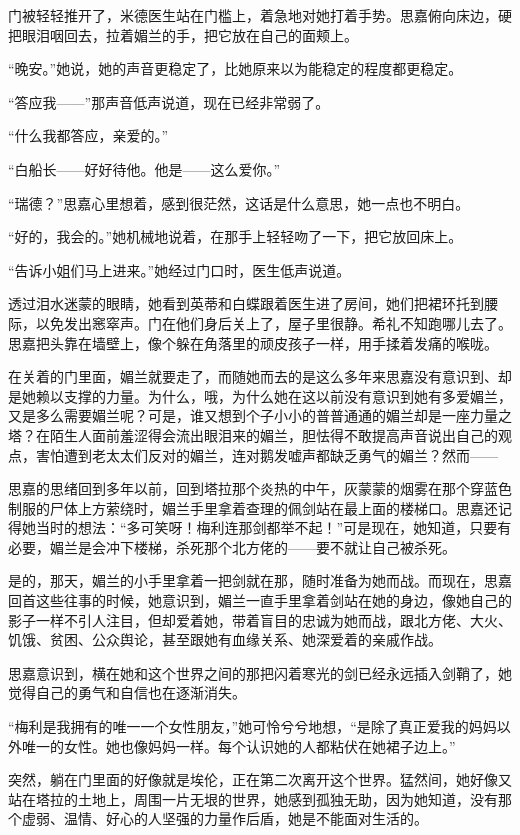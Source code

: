 \par 门被轻轻推开了，米德医生站在门槛上，着急地对她打着手势。思嘉俯向床边，硬把眼泪咽回去，拉着媚兰的手，把它放在自己的面颊上。
\par “晚安。”她说，她的声音更稳定了，比她原来以为能稳定的程度都更稳定。
\par “答应我——”那声音低声说道，现在已经非常弱了。
\par “什么我都答应，亲爱的。”
\par “白船长——好好待他。他是——这么爱你。”
\par “瑞德？”思嘉心里想着，感到很茫然，这话是什么意思，她一点也不明白。
\par “好的，我会的。”她机械地说着，在那手上轻轻吻了一下，把它放回床上。
\par “告诉小姐们马上进来。”她经过门口时，医生低声说道。
\par 透过泪水迷蒙的眼睛，她看到英蒂和白蝶跟着医生进了房间，她们把裙环托到腰际，以免发出窸窣声。门在他们身后关上了，屋子里很静。希礼不知跑哪儿去了。思嘉把头靠在墙壁上，像个躲在角落里的顽皮孩子一样，用手揉着发痛的喉咙。
\par 在关着的门里面，媚兰就要走了，而随她而去的是这么多年来思嘉没有意识到、却是她赖以支撑的力量。为什么，哦，为什么她在这以前没有意识到她有多爱媚兰，又是多么需要媚兰呢？可是，谁又想到个子小小的普普通通的媚兰却是一座力量之塔？在陌生人面前羞涩得会流出眼泪来的媚兰，胆怯得不敢提高声音说出自己的观点，害怕遭到老太太们反对的媚兰，连对鹅发嘘声都缺乏勇气的媚兰？然而——
\par 思嘉的思绪回到多年以前，回到塔拉那个炎热的中午，灰蒙蒙的烟雾在那个穿蓝色制服的尸体上方萦绕时，媚兰手里拿着查理的佩剑站在最上面的楼梯口。思嘉还记得她当时的想法：“多可笑呀！梅利连那剑都举不起！”可是现在，她知道，只要有必要，媚兰是会冲下楼梯，杀死那个北方佬的——要不就让自己被杀死。
\par 是的，那天，媚兰的小手里拿着一把剑就在那，随时准备为她而战。而现在，思嘉回首这些往事的时候，她意识到，媚兰一直手里拿着剑站在她的身边，像她自己的影子一样不引人注目，但却爱着她，带着盲目的忠诚为她而战，跟北方佬、大火、饥饿、贫困、公众舆论，甚至跟她有血缘关系、她深爱着的亲戚作战。
\par 思嘉意识到，横在她和这个世界之间的那把闪着寒光的剑已经永远插入剑鞘了，她觉得自己的勇气和自信也在逐渐消失。
\par “梅利是我拥有的唯一一个女性朋友，”她可怜兮兮地想，“是除了真正爱我的妈妈以外唯一的女性。她也像妈妈一样。每个认识她的人都粘伏在她裙子边上。”
\par 突然，躺在门里面的好像就是埃伦，正在第二次离开这个世界。猛然间，她好像又站在塔拉的土地上，周围一片无垠的世界，她感到孤独无助，因为她知道，没有那个虚弱、温情、好心的人坚强的力量作后盾，她是不能面对生活的。
